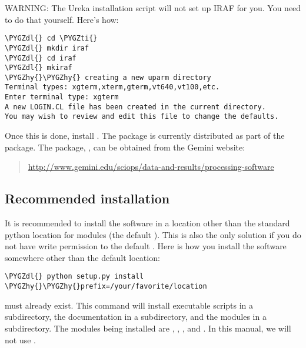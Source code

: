 \documentclass[letterpaper,10pt,english]{sphinxmanual}
\def\PYGZdl{\char`\$}
\def\PYGZhy{\char`\-}
\def\PYGZti{\char`\~}
\begin{document}
WARNING:  The Ureka installation script will not set up IRAF for you. You need to do
that yourself. Here's how:

\begin{Verbatim}[commandchars=\\\{\}]
\PYGZdl{} cd \PYGZti{}
\PYGZdl{} mkdir iraf
\PYGZdl{} cd iraf
\PYGZdl{} mkiraf
\PYGZhy{}\PYGZhy{} creating a new uparm directory
Terminal types: xgterm,xterm,gterm,vt640,vt100,etc.
Enter terminal type: xgterm
A new LOGIN.CL file has been created in the current directory.
You may wish to review and edit this file to change the defaults.
\end{Verbatim}

Once this is done, install .  The  package is currently
distributed as part of the  package.  The  package,
, can be obtained from the Gemini website:
\begin{quote}

\href{http://www.gemini.edu/sciops/data-and-results/processing-software}{http://www.gemini.edu/sciops/data-and-results/processing-software}
\end{quote}


\subsection{Recommended installation}
\label{intro:recommended-installation}
It is recommended to install the software in a location other than the standard python
location for modules (the default ). This is also the only solution if
you do not have write permission to the default .  Here is how you
install the software somewhere other than the default location:

\begin{Verbatim}[commandchars=\\\{\}]
\PYGZdl{} python setup.py install \PYGZhy{}\PYGZhy{}prefix=/your/favorite/location
\end{Verbatim}

 must already exist.  This command will install executable
scripts in a  subdirectory, the documentation in a  subdirectory,
and the modules in a  subdirectory.  The modules being
installed are , , , and .
In this manual, we will not use .
\end{document}
